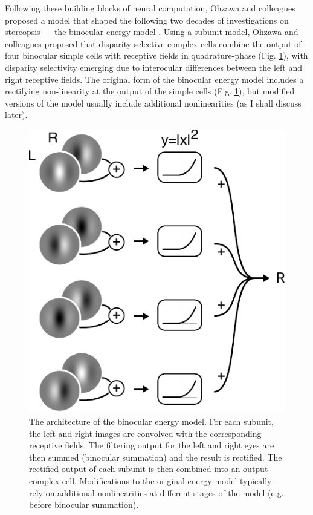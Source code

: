 Following these building blocks of neural computation, Ohzawa and colleagues proposed a model that shaped the following two decades of investigations on stereopsis --- the binocular energy model \cite{Ohzawa:1990cq}. Using a subunit model, Ohzawa and colleagues proposed that disparity selective complex cells combine the output of four binocular simple cells with receptive fields in quadrature-phase  (Fig. \ref{fig:dem}), with disparity selectivity emerging due to interocular differences between the left and right receptive fields. The original form of the binocular energy model includes a rectifying non-linearity at the output of the simple cells (Fig. \ref{fig:dem}), but modified versions of the model usually include additional nonlinearities (as I shall discuss later).

\begin{figure}
  \centering
  \includegraphics{dem-arch}
  \caption[The architecture of the binocular energy model.]{The architecture of the binocular energy model. For each subunit, the left and right images are convolved with the corresponding receptive fields. The filtering output for the left and right eyes are then summed (binocular summation) and the result is rectified. The rectified output of each subunit is then combined into an output complex cell. Modifications to the original energy model typically rely on additional nonlinearities at different stages of the model (e.g. before binocular summation).}
  \label{fig:dem}
\end{figure}

